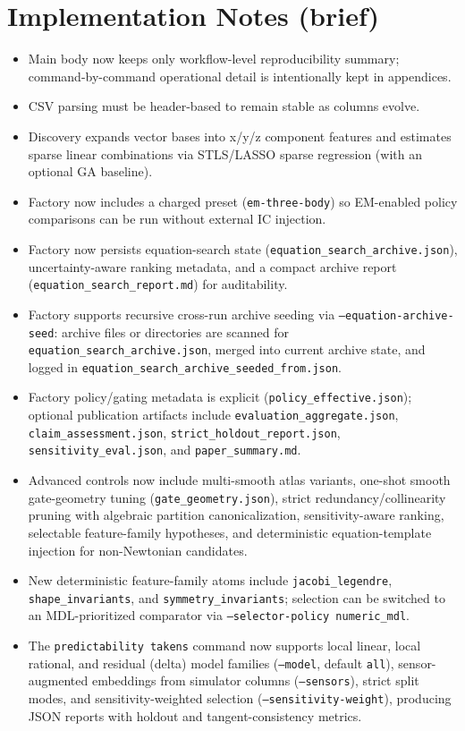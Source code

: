 \documentclass[11pt]{article}
\begin{document}
\section{Implementation Notes (brief)}
\begin{itemize}
\item Main body now keeps only workflow-level reproducibility summary; command-by-command operational detail is intentionally kept in appendices.
\item CSV parsing must be header-based to remain stable as columns evolve.
\item Discovery expands vector bases into x/y/z component features and estimates sparse linear combinations via STLS/LASSO sparse regression (with an optional GA baseline).
\item Factory now includes a charged preset (\texttt{em-three-body}) so EM-enabled policy comparisons can be run without external IC injection.
\item Factory now persists equation-search state (\texttt{equation\_search\_archive.json}), uncertainty-aware ranking metadata, and a compact archive report (\texttt{equation\_search\_report.md}) for auditability.
\item Factory supports recursive cross-run archive seeding via \texttt{--equation-archive-seed}: archive files or directories are scanned for \texttt{equation\_search\_archive.json}, merged into current archive state, and logged in \texttt{equation\_search\_archive\_seeded\_from.json}.
\item Factory policy/gating metadata is explicit (\texttt{policy\_effective.json}); optional publication artifacts include \texttt{evaluation\_aggregate.json}, \texttt{claim\_assessment.json}, \texttt{strict\_holdout\_report.json}, \texttt{sensitivity\_eval.json}, and \texttt{paper\_summary.md}.
\item Advanced controls now include multi-smooth atlas variants, one-shot smooth gate-geometry tuning (\texttt{gate\_geometry.json}), strict redundancy/collinearity pruning with algebraic partition canonicalization, sensitivity-aware ranking, selectable feature-family hypotheses, and deterministic equation-template injection for non-Newtonian candidates.
\item New deterministic feature-family atoms include \texttt{jacobi\_legendre}, \texttt{shape\_invariants}, and \texttt{symmetry\_invariants}; selection can be switched to an MDL-prioritized comparator via \texttt{--selector-policy numeric\_mdl}.
\item The \texttt{predictability takens} command now supports local linear, local rational, and residual (delta) model families (\texttt{--model}, default \texttt{all}), sensor-augmented embeddings from simulator columns (\texttt{--sensors}), strict split modes, and sensitivity-weighted selection (\texttt{--sensitivity-weight}), producing JSON reports with holdout and tangent-consistency metrics.

\end{itemize}
\end{document}
